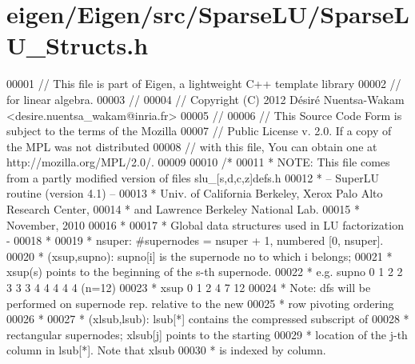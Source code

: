\hypertarget{eigen_2_eigen_2src_2_sparse_l_u_2_sparse_l_u___structs_8h_source}{}\section{eigen/\+Eigen/src/\+Sparse\+L\+U/\+Sparse\+L\+U\+\_\+\+Structs.h}
\label{eigen_2_eigen_2src_2_sparse_l_u_2_sparse_l_u___structs_8h_source}

\begin{DoxyCode}
00001 \textcolor{comment}{// This file is part of Eigen, a lightweight C++ template library}
00002 \textcolor{comment}{// for linear algebra.}
00003 \textcolor{comment}{//}
00004 \textcolor{comment}{// Copyright (C) 2012 Désiré Nuentsa-Wakam <desire.nuentsa\_wakam@inria.fr>}
00005 \textcolor{comment}{//}
00006 \textcolor{comment}{// This Source Code Form is subject to the terms of the Mozilla}
00007 \textcolor{comment}{// Public License v. 2.0. If a copy of the MPL was not distributed}
00008 \textcolor{comment}{// with this file, You can obtain one at http://mozilla.org/MPL/2.0/.}
00009 
00010 \textcolor{comment}{/* }
00011 \textcolor{comment}{ * NOTE: This file comes from a partly modified version of files slu\_[s,d,c,z]defs.h}
00012 \textcolor{comment}{ * -- SuperLU routine (version 4.1) --}
00013 \textcolor{comment}{ * Univ. of California Berkeley, Xerox Palo Alto Research Center,}
00014 \textcolor{comment}{ * and Lawrence Berkeley National Lab.}
00015 \textcolor{comment}{ * November, 2010}
00016 \textcolor{comment}{ * }
00017 \textcolor{comment}{ * Global data structures used in LU factorization -}
00018 \textcolor{comment}{ * }
00019 \textcolor{comment}{ *   nsuper: #supernodes = nsuper + 1, numbered [0, nsuper].}
00020 \textcolor{comment}{ *   (xsup,supno): supno[i] is the supernode no to which i belongs;}
00021 \textcolor{comment}{ *  xsup(s) points to the beginning of the s-th supernode.}
00022 \textcolor{comment}{ *  e.g.   supno 0 1 2 2 3 3 3 4 4 4 4 4   (n=12)}
00023 \textcolor{comment}{ *          xsup 0 1 2 4 7 12}
00024 \textcolor{comment}{ *  Note: dfs will be performed on supernode rep. relative to the new }
00025 \textcolor{comment}{ *        row pivoting ordering}
00026 \textcolor{comment}{ *}
00027 \textcolor{comment}{ *   (xlsub,lsub): lsub[*] contains the compressed subscript of}
00028 \textcolor{comment}{ *  rectangular supernodes; xlsub[j] points to the starting}
00029 \textcolor{comment}{ *  location of the j-th column in lsub[*]. Note that xlsub }
00030 \textcolor{comment}{ *  is indexed by column.}

\end{DoxyCode}
